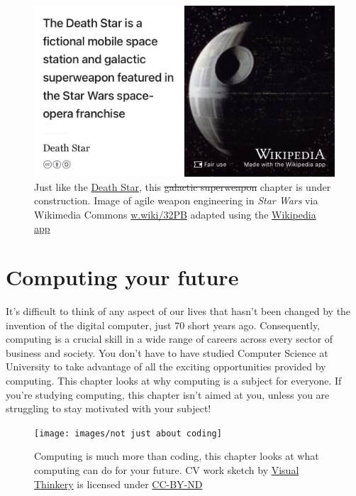 \documentclass[
]{book}
\begin{document}
\begin{figure}

{\centering \includegraphics[width=0.99\linewidth]{images/DeathStar2} 

}

\caption{Just like the \href{https://en.wikipedia.org/wiki/Death_Star}{Death Star}, this \sout{galactic superweapon} chapter is under construction. Image of agile weapon engineering in \emph{Star Wars} via Wikimedia Commons \href{https://w.wiki/32PB}{w.wiki/32PB} adapted using the \href{https://apps.apple.com/gb/app/wikipedia/id324715238}{Wikipedia app}}\label{fig:deathstar2-fig}
\end{figure}

\hypertarget{computing}{%
\chapter{Computing your future}\label{computing}}

It's difficult to think of any aspect of our lives that hasn't been changed by the invention of the digital computer, just 70 short years ago. Consequently, computing is a crucial skill in a wide range of careers across every sector of business and society. You don't have to have studied Computer Science at University to take advantage of all the exciting opportunities provided by computing. This chapter looks at why computing is a subject for everyone. If you're studying computing, this chapter isn't aimed at you, unless you are struggling to stay motivated with your subject! 👨🏿‍💻👨‍💻👩🏽‍💻👩‍💻👨🏿‍💻

\begin{figure}

{\centering \texttt{[image: images/not just about coding]} 

}

\caption{Computing is much more than coding, this chapter looks at what computing can do for your future. CV work sketch by \href{https://visualthinkery.com}{Visual Thinkery} is licensed under \href{https://creativecommons.org/licenses/by-nd/4.0/}{CC-BY-ND}}\label{fig:not-coding-fig}
\end{figure}
\end{document}
